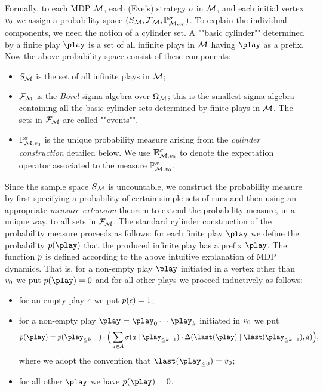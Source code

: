 Formally, to each MDP $\mathcal{M}$, each (Eve's) strategy $\sigma$ in $\mathcal{M}$, and 
each initial vertex $v_0$ we assign a probability space 
$(S_{\mathcal{M}},\mathcal{F}_{\mathcal{M}},\mathbb{P}^{\sigma}_{\mathcal{M},v_0})$. To 
explain the individual components, we need the notion of a cylinder set. A 
""basic cylinder"" determined by a finite play $\play$ is a set of 
all infinite plays in $\mathcal{M}$ having $\play$ as a prefix. Now the above 
probability space consist of these components:
\begin{itemize}
	\item $S_{\mathcal{M}}$ is the set of all infinite plays in $\mathcal{M}$;
	\item $\mathcal{F}_{\mathcal{M}}$ is the \emph{Borel} sigma-algebra over 
	$\Omega_{\mathcal{M}}$; this is the smallest sigma-algebra containing all the 
	basic cylinder sets determined by finite plays in $\mathcal{M}$. The sets in 
	$\mathcal{F}_{\mathcal{M}}$ are called ""events"".
	\item $\mathbb{P}^{\sigma}_{\mathcal{M},v_0}$ is the unique probability measure 
	arising from the \emph{cylinder construction} detailed below. We use 
	$\mathbf{E}^{\sigma}_{\mathcal{M},v_0}$ to denote the expectation operator 
	associated to the measure $\mathbb{P}^{\sigma}_{\mathcal{M},v_0}$.
\end{itemize}

Since the sample space $S_{\mathcal{M}}$ is uncountable, we construct the 
probability measure by first specifying a probability of certain simple sets of 
runs and then using an appropriate \emph{measure-extension} theorem to extend 
the probability measure, in a unique way, to all sets in $\mathcal{F}_{\mathcal{M}}$.
The standard cylinder construction of the probability measure 
proceeds as follows: for each finite play $\play$ we define the probability 
$\cylProb(\play)$ that the produced infinite play has a prefix $\play$. The 
function $p$ is defined according to the above intuitive explanation of 
MDP dynamics. That is, for a non-empty play $\play$ initiated in a vertex other 
than $v_0$ we put $\cylProb(\play)=0$ and for all other plays we proceed 
inductively as follows:

\begin{itemize}
\item for an empty play $\epsilon$ we put $p(\epsilon)=1$;
\item for a non-empty play $\play=\play_0\cdots \play_{k}$ initiated in 
$v_0$ we put 
\[\cylProb(\play) = \cylProb(\play_{\leq k-1})\cdot \Big(\sum_{a \in \actions} 
\sigma(a\mid \play_{\leq k-1})\cdot \probTranFunc(\last(\play)\mid 
\last(\play_{\leq k-1}),a) 
\Big), \]
where we adopt the convention that $\last(\play_{\leq 0})=\vinit$;
\item for all other $\play$ we have $\cylProb(\play)=0$.
\end{itemize}

